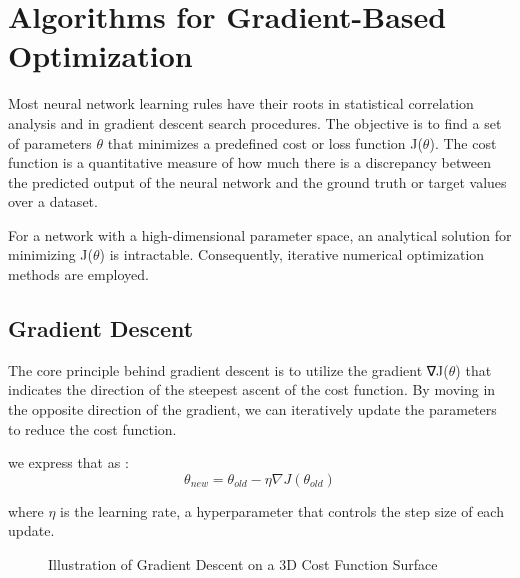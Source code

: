 \section{Algorithms for Gradient-Based Optimization}

Most neural network learning rules have their roots in statistical correlation analysis and
in gradient descent search procedures. The objective is to find a set of parameters $\theta$ that minimizes a predefined cost or loss function J($\theta$). The cost function is a quantitative measure of how much there is a discrepancy between the predicted output of the neural network and the ground truth or target values over a dataset.

For a network with a high-dimensional parameter space, an analytical solution for minimizing J($\theta$) is intractable. Consequently, iterative numerical optimization methods are employed.

\subsection{Gradient Descent}

The core principle behind gradient descent is to utilize the gradient ∇J($\theta$) that indicates the direction of the steepest ascent of the cost function. By moving in the opposite direction of the gradient, we can iteratively update the parameters to reduce the cost function.

we express that as :
\[
\theta_{new} = \theta_{old} - \eta \nabla J(\theta_{old})
\]

where $\eta$ is the learning rate, a hyperparameter that controls the step size of each update.




\begin{figure}[h]
	\centering
	\caption{Illustration of Gradient Descent on a 3D Cost Function Surface}
	\label{fig:gradient_descent}
\end{figure}

